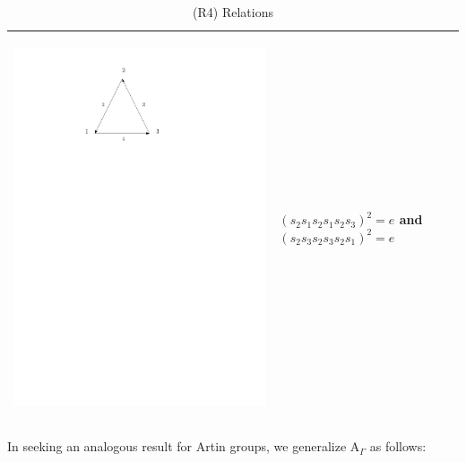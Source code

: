 \documentclass[11pt]{amsart}
\theoremstyle{definition}
\begin{document}
\begin{table}[h]
\begin{tabular}{| p{3.5cm} | p{7cm} |}
\begin{center}\includegraphics[scale = .30]{Diagram5.pdf}\end{center} & $(s_{2}s_{1}s_{2}s_{1}s_{2}s_{3})^{2} = e$ and $(s_{2}s_{3}s_{2}s_{3}s_{2}s_{1})^{2} = e$ \\ \hline
\end{tabular}
\caption{(R4) Relations} \label{table1}
\end{table}

In seeking an analogous result for Artin groups, we generalize A$_{\Gamma}$ as follows:
\end{document}
